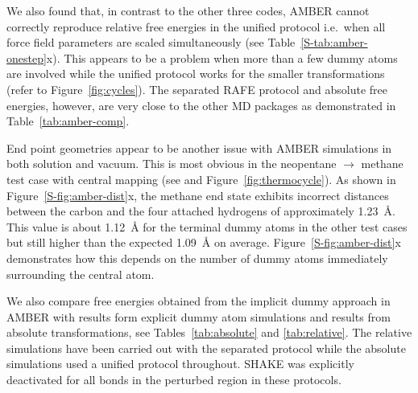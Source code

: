 \documentclass[journal=jctcce,manuscript=article]{achemso}
\begin{document}
We also found that, in contrast to the other three codes, AMBER cannot
correctly reproduce relative free energies in the unified protocol i.e.\
when all force field parameters are scaled simultaneously (see 
Table~\ref{S-tab:amber-onestep}x).  This appears to be a problem when more than 
a few dummy atoms are involved while the unified protocol works for the smaller 
transformations (refer to Figure~\ref{fig:cycles}).  The separated RAFE 
protocol and absolute free energies, however, are very close to the other MD 
packages as demonstrated in Table~\ref{tab:amber-comp}.

End point geometries appear to be another issue with AMBER simulations
in both solution and vacuum.  This is most obvious in the neopentane 
$\rightarrow$ methane test case with central mapping (see 
 and Figure~\ref{fig:thermocycle}).
As shown in Figure~\ref{S-fig:amber-dist}x, the methane end state exhibits 
incorrect distances between the carbon and the four 
attached hydrogens of approximately \SI{1.23}{\angstrom}.  This value is about 
\SI{1.12}{\angstrom} for the terminal dummy atoms in the other test cases but 
still higher than the expected \SI{1.09}{\angstrom} on average.  
Figure~\ref{S-fig:amber-dist}x demonstrates how this depends on the number of 
dummy atoms immediately surrounding the central atom.

We also compare free energies obtained from the implicit dummy approach in 
AMBER with results form explicit dummy atom simulations and results from 
absolute transformations, see Tables~\ref{tab:absolute} and 
\ref{tab:relative}.  The relative simulations have been carried out with the 
separated protocol while the absolute simulations used a unified protocol 
throughout.  SHAKE was explicitly deactivated for all bonds in the perturbed 
region in these protocols.
\end{document}
